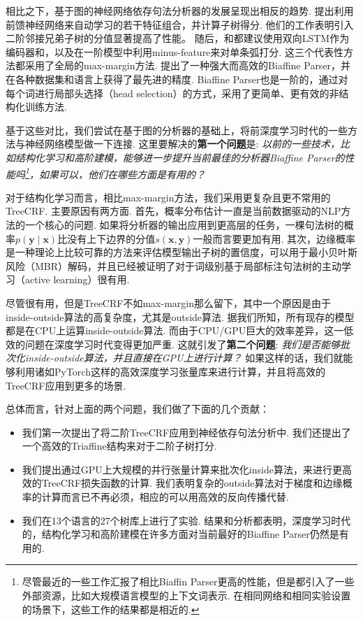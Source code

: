 相比之下，基于图的神经网络依存句法分析器的发展呈现出相反的趋势.
\cite{pei-etal-2015-effective}提出利用前馈神经网络来自动学习\cite{chen-manning-2014-fast}的若干特征组合，并计算子树得分.
他们的工作表明引入二阶邻接兄弟子树的分值显著提高了性能。
随后，\cite{wang-chang-2016-graph}和\cite{kiperwasser-goldberg-2016-simple}都建议使用双向LSTM作为编码器和，以及在一阶模型中利用minus-feature来对单条弧打分.
这三个代表性方法都采用了全局的max-margin方法.
\cite{Timothy-d17-biaffine}提出了一种强大而高效的Biaffine Parser，并在各种数据集和语言上获得了最先进的精度.
Biaffine Parser也是一阶的，通过对每个词进行局部头选择（head selection）的方式\cite{zhang-etal-2017-dependency-parsing}，采用了更简单、更有效的非结构化训练方法.

基于这些对比，我们尝试在基于图的分析器的基础上，将前深度学习时代的一些方法与神经网络模型做一下连接.
这里要解决的\textbf{第一个问题}是:
\emph{以前的一些技术，比如结构化学习和高阶建模，能够进一步提升当前最佳的分析器Biaffine Parser的性能吗\footnote{
        尽管最近的一些工作汇报了相比Biaffin Parser更高的性能，但是都引入了一些外部资源，比如大规模语言模型的上下文词表示. 在相同网络和相同实验设置的场景下，这些工作的结果都是相近的.
    }，如果可以，他们在哪些方面是有用的？}

对于结构化学习而言，相比max-margin方法，我们采用更复杂且更不常用的TreeCRF.
主要原因有两方面.
首先，概率分布估计一直是当前数据驱动的NLP方法的一个核心的问题\cite{le-zuidema-2014-inside}.
如果将分析器的输出应用到更高层的任务，一棵句法树的概率$p(\boldsymbol{y}\mid\boldsymbol{x})$比没有上下边界的分值$s (\boldsymbol{x},\boldsymbol{y})$一般而言要更加有用.
其次，边缘概率是一种理论上比较可靠的方法来评估模型输出子树的置信度，可以用于最小贝叶斯风险（MBR）解码\cite{smith-smith-2007-probabilistic}，并且已经被证明了对于词级别基于局部标注句法树的主动学习（active learning）\cite{li-etal-2016-active}很有用.

尽管很有用，但是TreeCRF不如max-margin那么留下，其中一个原因是由于inside-outside算法的高复杂度，尤其是outside算法.
据我们所知，所有现存的模型都是在CPU上运算inside-outside算法.
而由于CPU/GPU巨大的效率差异，这一低效的问题在深度学习时代变得更加严重.
这就引发了\textbf{第二个问题}:
\emph{我们是否能够批次化inside-outside算法，并且直接在GPU上进行计算？}
如果这样的话，我们就能够利用诸如PyTorch这样的高效深度学习张量库来进行计算，并且将高效的TreeCRF应用到更多的场景\cite{cai-etal-2017-crf,le-zuidema-2014-inside}.

总体而言，针对上面的两个问题，我们做了下面的几个贡献：
\begin{itemize}%
    \item 我们第一次提出了将二阶TreeCRF应用到神经依存句法分析中.
          我们还提出了一个高效的Triaffine结构来对于二阶子树打分.
    \item 我们提出通过GPU上大规模的并行张量计算来批次化inside算法，来进行更高效的TreeCRF损失函数的计算.
          我们表明复杂的outside算法对于梯度和边缘概率的计算而言已不再必须，相应的可以用高效的反向传播代替.
    \item 我们在13个语言的27个树库上进行了实验.
          结果和分析都表明，深度学习时代的，结构化学习和高阶建模在许多方面对当前最好的Biaffine Parser仍然是有用的.
\end{itemize}

